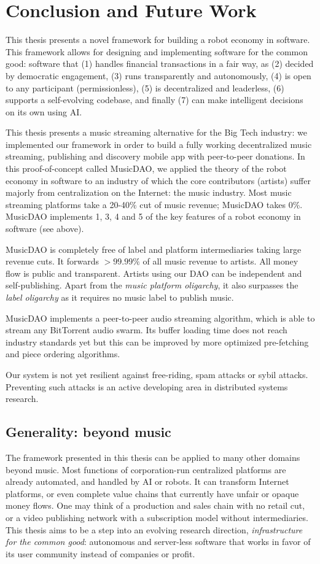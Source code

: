 \chapter{Conclusion and Future Work}
This thesis presents a novel framework for building a robot economy in software. This framework allows for designing and implementing software for the common good: software that (1) handles financial transactions in a fair way, as (2) decided by democratic engagement, (3) runs transparently and autonomously, (4) is open to any participant (permissionless), (5) is decentralized and leaderless, (6) supports a self-evolving codebase, and finally (7) can make intelligent decisions on its own using AI.

This thesis presents a music streaming alternative for the Big Tech industry: we implemented our framework in order to build a fully working decentralized music streaming, publishing and discovery mobile app with peer-to-peer donations. In this proof-of-concept called MusicDAO, we applied the theory of the robot economy in software to an industry of which the core contributors (artists) suffer majorly from centralization on the Internet: the music industry. Most music streaming platforms take a 20-40\% cut of music revenue; MusicDAO takes 0\%. MusicDAO implements 1, 3, 4 and 5 of the key features of a robot economy in software (see above).

MusicDAO is completely free of label and platform intermediaries taking large revenue cuts. It forwards $>99.99\%$ of all music revenue to artists. All money flow is public and transparent. Artists using our DAO can be independent and self-publishing. Apart from the \textit{music platform oligarchy}, it also surpasses the \textit{label oligarchy} as it requires no music label to publish music.

MusicDAO implements a peer-to-peer audio streaming algorithm, which is able to stream any BitTorrent audio swarm. Its buffer loading time does not reach industry standards yet but this can be improved by more optimized pre-fetching and piece ordering algorithms. 

Our system is not yet resilient against free-riding, spam attacks or sybil attacks. Preventing such attacks is an active developing area in distributed systems research.

\section{Generality: beyond music}
The framework presented in this thesis can be applied to many other domains beyond music. Most functions of corporation-run centralized platforms are already automated, and handled by AI or robots. It can transform Internet platforms, or even complete value chains that currently have unfair or opaque money flows. One may think of a production and sales chain with no retail cut, or a video publishing network with a subscription model without intermediaries. This thesis aims to be a step into an evolving research direction, \textit{infrastructure for the common good}: autonomous and server-less software that works in favor of its user community instead of companies or profit.

